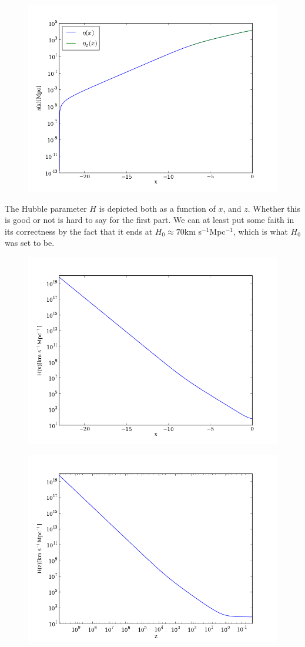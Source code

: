 \documentclass{aa}   %
\begin{document}
  \begin{figure}[ht]
  \includegraphics[width=.49\textwidth]{figure_1.png}
  \caption{}
 \label{figure1}
 \end{figure}
 
 The Hubble parameter $H$ is depicted both as a function of $x$, and $z$. Whether this is good or not is hard to say for the first part. We can at least put some faith in its correctness by the fact that it ends at $H_0 \approx 70$km s$^{-1}$Mpc$^{-1}$, which is what $H_0$ was set to be. 
 
  \begin{figure}[ht]
  \includegraphics[width=.49\textwidth]{figure_2.png}
  \caption{}
 \label{figure2}
 \end{figure}

 
 \begin{figure}[ht]
  \includegraphics[width=.49\textwidth]{figure_3.png}
  \caption{}
 \label{figure3}
 \end{figure}
% 
\end{document}
